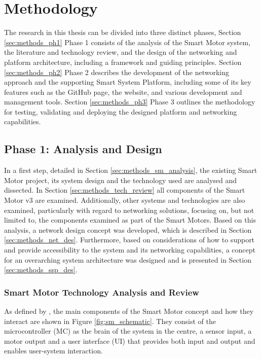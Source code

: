 \cleardoublepage%
\chapter{\label{chap:methods}Methodology}%

The research in this thesis can be divided into three distinct phases, Section \ref{sec:methods_ph1} Phase 1 consists of the analysis of the Smart Motor system, the literature and technology review, and the design of the networking and platform architecture, including a framework and guiding principles. Section \ref{sec:methods_ph2} Phase 2 describes the development of the networking approach and the supporting Smart System Platform, including some of its key features such as the GitHub page, the website, and various development and management tools. Section \ref{sec:methods_ph3} Phase 3 outlines the methodology for testing, validating and deploying the designed platform and networking capabilities.

\section{\label{sec:methods_ph1}Phase 1: Analysis and Design}

In a first step, detailed in Section \ref{sec:methods_sm_analysis}, the existing Smart Motor project, its system design and the technology used are analysed and dissected. In Section \ref{sec:methods_tech_review} all components of the Smart Motor v3 are examined. 
Additionally, other systems and technologies are also examined, particularly with regard to networking solutions, focusing on, but not limited to, the components examined as part of the Smart Motors. 
Based on this analysis, a network design concept was developed, which is described in Section \ref{sec:methods_net_des}. Furthermore, based on considerations of how to support and provide accessibility to the system and its networking capabilities, a concept for an overarching system architecture was designed and is presented in Section \ref{sec:methods_ssp_des}.

\subsection{\label{sec:methods_sm_analysis}Smart Motor Technology Analysis and Review}

As defined by \citet[]{dahal_designing_2024}, the main components of the Smart Motor concept and how they interact are shown in Figure \ref{fig:sm_schematic}. They consist of the microcontroller (MC) as the brain of the system in the centre, a sensor input, a motor output and a user interface (UI) that provides both input and output and enables user-system interaction.

